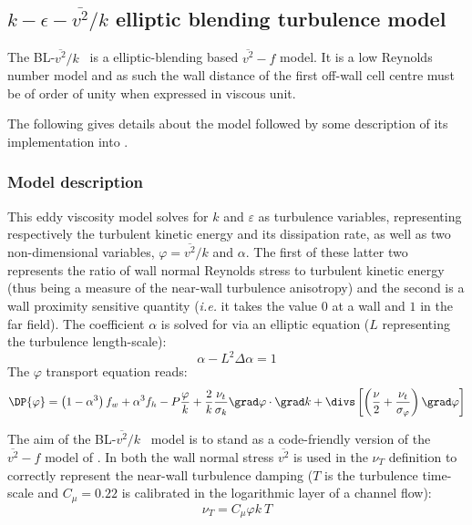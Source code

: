 \subsection{$k-\epsilon-\overline{v^2}/k$ elliptic blending turbulence model}

The BL-$\overline{v^2}/k$~ \cite{Billard:2012} is a  elliptic-blending based $\overline{v^2}-f$ model.
It is a low Reynolds number model and as such the wall distance of the first off-wall cell centre must be of order of unity when expressed in viscous unit.

The following gives details about the model followed by some description of its implementation into \CS.

\subsubsection{Model description}

This eddy viscosity model solves for $k$ and $\varepsilon$ as turbulence variables,
representing respectively the turbulent kinetic energy and its dissipation rate,
as well as two non-dimensional variables, $\varphi=\overline{v^2}/k$ and $\alpha$.
The first of these latter two represents the ratio of wall normal Reynolds stress
to turbulent kinetic energy (thus being a measure of the near-wall turbulence anisotropy)
and the second is a wall proximity sensitive quantity (\emph{i.e.} it takes the value $0$ at a wall and $1$ in the far field).
The coefficient $\alpha$ is solved for via an elliptic equation
($L$ representing the turbulence length-scale):
\begin{equation}
		\alpha - L^2 \Delta \alpha = 1
		\label{eq:turbul:blv2kalpha}
\end{equation}
%
The $\varphi$ transport equation reads:
%
\begin{equation}\label{eq:turbul:blv2kphi}
\DP{\varphi}  =
   \left( 1-\alpha^3 \right) f_w
 + \alpha^3 f_h - P \frac{\varphi}{k}
+  \frac{2}{k} \frac{\nu_t}{\sigma_k} \grad \varphi  \cdot \grad k + \divs \left[ \left( \frac{\nu}{2} + \frac{\nu_t}{\sigma_\varphi}  \right) \grad \varphi \right]
\end{equation}

The aim of the BL-$\overline{v^2}/k$~ model is to stand as a code-friendly version
of the $\overline{v^2}-f$ model of \cite{Durbin:1991}. In both the wall normal stress
$\overline{v^2}$ is used in the $\nu_T$ definition to correctly represent the near-wall turbulence
damping ($T$ is the turbulence time-scale and $C_\mu=0.22$ is calibrated in the logarithmic layer of a channel flow):
%
\begin{equation}
	\nu_T= C_\mu \varphi k ~ T
\end{equation}

